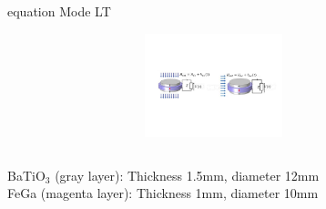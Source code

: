 \documentclass[compress]{beamer}
\begin{document}
\begin{frame}
\begin{columns}[totalwidth=\textwidth]
\begin{column}{.49\textwidth}
       \begin{beamercolorbox}[sep=8pt,center]{equation}
      Mode LT 
      \end{beamercolorbox}
\centering \includegraphics[height=3cm,width=0.9\textwidth]{Graphic/03_circuitLT.pdf}
   \end{column}
\end{columns}
\centering
{\small
BaTiO$_3$ (gray layer): Thickness 1.5mm, diameter 12mm \\
FeGa (magenta layer): Thickness 1mm, diameter 10mm	
}
\end{frame}
\end{document}
